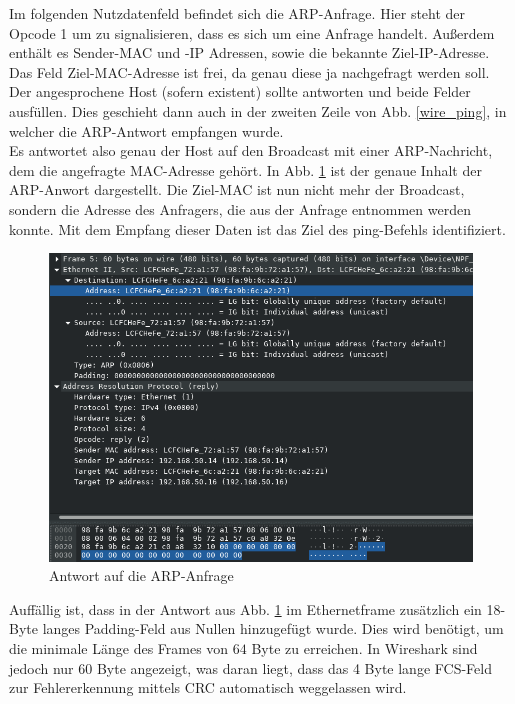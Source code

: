 Im folgenden Nutzdatenfeld befindet sich die ARP-Anfrage. Hier steht der Opcode 1 um zu signalisieren, dass es sich um eine Anfrage handelt. Außerdem enthält es Sender-MAC und -IP Adressen, sowie die bekannte Ziel-IP-Adresse. Das Feld Ziel-MAC-Adresse ist frei, da genau diese ja nachgefragt werden soll. Der angesprochene Host (sofern existent) sollte antworten und beide Felder ausfüllen. Dies geschieht dann auch in der zweiten Zeile von Abb. \ref{wire_ping}, in welcher die ARP-Antwort empfangen wurde.\\

Es antwortet also genau der Host auf den Broadcast mit einer ARP-Nachricht, dem die angefragte MAC-Adresse gehört. In Abb. \ref{arp_answer} ist der genaue Inhalt der ARP-Anwort dargestellt. Die Ziel-MAC ist nun nicht mehr der Broadcast, sondern die Adresse des Anfragers, die aus der Anfrage entnommen werden konnte. Mit dem Empfang dieser Daten ist das Ziel des ping-Befehls identifiziert.

\begin{figure}[H]
  \begin{center}
    \includegraphics[width=\textwidth]{graphics/versuch/3_3/wireshark/arp_answer}
    \caption{Antwort auf die ARP-Anfrage}\label{arp_answer}
  \end{center}
\end{figure}

\label{CRC_erklar} Auffällig ist, dass in der Antwort aus Abb. \ref{arp_answer} im Ethernetframe zusätzlich ein 18-Byte langes Padding-Feld aus Nullen hinzugefügt wurde. Dies wird benötigt, um die minimale Länge des Frames von $64$ Byte zu erreichen. In Wireshark sind jedoch nur 60 Byte angezeigt, was daran liegt, dass das 4 Byte lange FCS-Feld zur Fehlererkennung mittels CRC automatisch weggelassen wird.\\

